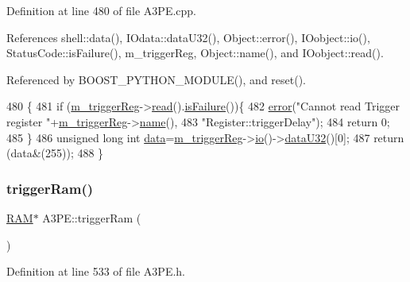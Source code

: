 Definition at line 480 of file A3\+P\+E.\+cpp.



References shell\+::data(), I\+Odata\+::data\+U32(), Object\+::error(), I\+Oobject\+::io(), Status\+Code\+::is\+Failure(), m\+\_\+trigger\+Reg, Object\+::name(), and I\+Oobject\+::read().



Referenced by B\+O\+O\+S\+T\+\_\+\+P\+Y\+T\+H\+O\+N\+\_\+\+M\+O\+D\+U\+L\+E(), and reset().


\begin{DoxyCode}
480                                \{
481   \textcolor{keywordflow}{if} (\hyperlink{classA3PE_a750158ae488121ab7969452f061e678c}{m\_triggerReg}->\hyperlink{classIOobject_aa07610c11963b1db6710e3c76ceea456}{read}().\hyperlink{classStatusCode_a5dd22dc6eb2c52fc4cabc58f6dea2eb7}{isFailure}())\{
482     \hyperlink{classObject_a204a95f57818c0f811933917a30eff45}{error}(\textcolor{stringliteral}{"Cannot read Trigger register "}+\hyperlink{classA3PE_a750158ae488121ab7969452f061e678c}{m\_triggerReg}->\hyperlink{classObject_a300f4c05dd468c7bb8b3c968868443c1}{name}(),
483         \textcolor{stringliteral}{"Register::triggerDelay"});
484     \textcolor{keywordflow}{return} 0;
485   \}
486   \textcolor{keywordtype}{unsigned} \textcolor{keywordtype}{long} \textcolor{keywordtype}{int} \hyperlink{namespaceshell_a5ea2525995cedc3efd69ea8a7f034d1e}{data}=\hyperlink{classA3PE_a750158ae488121ab7969452f061e678c}{m\_triggerReg}->\hyperlink{classIOobject_af04fb94137c3d86849f478ac5afab5d1}{io}()->\hyperlink{classIOdata_ab0e3cd09f46c1c3712f797116f6da074}{dataU32}()[0];
487   \textcolor{keywordflow}{return} (data&(255));
488 \}
\end{DoxyCode}
\mbox{\label{classA3PE_aad0f7ac467db22e5608ae6b0957665a1}} 
\subsubsection{\texorpdfstring{trigger\+Ram()}{triggerRam()}}
{\footnotesize\ttfamily \hyperlink{classRAM}{R\+AM}$\ast$ A3\+P\+E\+::trigger\+Ram (\begin{DoxyParamCaption}{ }\end{DoxyParamCaption})\hspace{0.3cm}{\ttfamily [inline]}}



Definition at line 533 of file A3\+P\+E.\+h.



